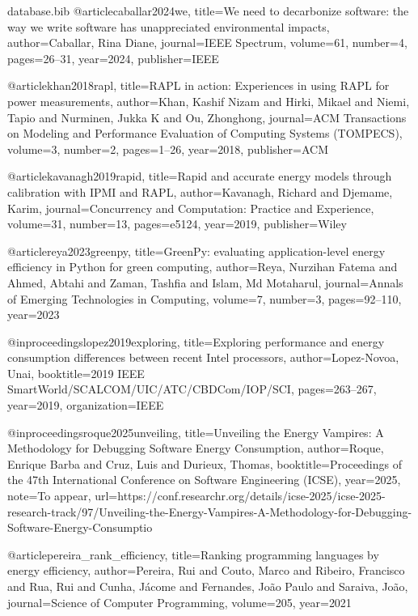 \begin{filecontents*}{database.bib}
@article{caballar2024we,
  title={We need to decarbonize software: the way we write software has unappreciated environmental impacts},
  author={Caballar, Rina Diane},
  journal={IEEE Spectrum},
  volume={61},
  number={4},
  pages={26--31},
  year={2024},
  publisher={IEEE}
}

@article{khan2018rapl,
  title={RAPL in action: Experiences in using RAPL for power measurements},
  author={Khan, Kashif Nizam and Hirki, Mikael and Niemi, Tapio and Nurminen, Jukka K and Ou, Zhonghong},
  journal={ACM Transactions on Modeling and Performance Evaluation of Computing Systems (TOMPECS)},
  volume={3},
  number={2},
  pages={1--26},
  year={2018},
  publisher={ACM}
}

@article{kavanagh2019rapid,
  title={Rapid and accurate energy models through calibration with IPMI and RAPL},
  author={Kavanagh, Richard and Djemame, Karim},
  journal={Concurrency and Computation: Practice and Experience},
  volume={31},
  number={13},
  pages={e5124},
  year={2019},
  publisher={Wiley}
}

@article{reya2023greenpy,
  title={GreenPy: evaluating application-level energy efficiency in Python for green computing},
  author={Reya, Nurzihan Fatema and Ahmed, Abtahi and Zaman, Tashfia and Islam, Md Motaharul},
  journal={Annals of Emerging Technologies in Computing},
  volume={7},
  number={3},
  pages={92--110},
  year={2023}
}

@inproceedings{lopez2019exploring,
  title={Exploring performance and energy consumption differences between recent Intel processors},
  author={Lopez-Novoa, Unai},
  booktitle={2019 IEEE SmartWorld/SCALCOM/UIC/ATC/CBDCom/IOP/SCI},
  pages={263--267},
  year={2019},
  organization={IEEE}
}

@inproceedings{roque2025unveiling,
  title={Unveiling the Energy Vampires: A Methodology for Debugging Software Energy Consumption},
  author={Roque, Enrique Barba and Cruz, Luis and Durieux, Thomas},
  booktitle={Proceedings of the 47th International Conference on Software Engineering (ICSE)},
  year={2025},
  note={To appear},
  url={https://conf.researchr.org/details/icse-2025/icse-2025-research-track/97/Unveiling-the-Energy-Vampires-A-Methodology-for-Debugging-Software-Energy-Consumptio}
}

@article{pereira_rank_efficiency,
  title={Ranking programming languages by energy efficiency},
  author={Pereira, Rui and Couto, Marco and Ribeiro, Francisco and Rua, Rui and Cunha, J{\'a}come and Fernandes, Jo{\~a}o Paulo and Saraiva, Jo{\~a}o},
  journal={Science of Computer Programming},
  volume={205},
  year={2021}
}


\end{filecontents*}
